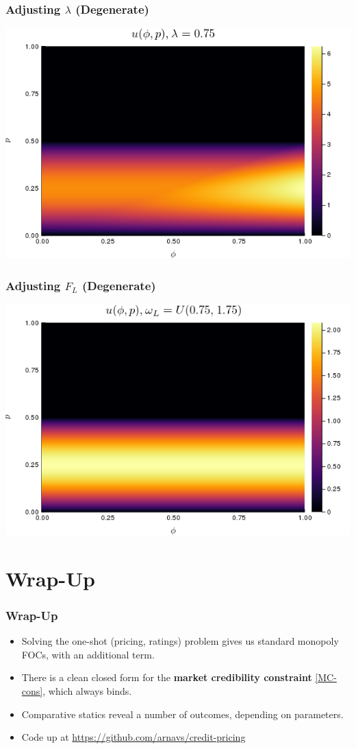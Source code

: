 \documentclass{beamer}
\begin{document}
\begin{frame}
    \frametitle{Adjusting $\lambda$ (Degenerate)}
    \includegraphics[scale=0.5]{high_lambda.png}
\end{frame}

\begin{frame}
    \frametitle{Adjusting $F_L$ (Degenerate)}
    \includegraphics[scale=0.5]{high_L.png}
\end{frame}


\section{Wrap-Up}

\begin{frame}
    \frametitle{Wrap-Up}
    \begin{itemize}
        \item Solving the one-shot (pricing, ratings) problem gives us standard monopoly FOCs, with an additional term.
        \item There is a clean closed form for the \textbf{market credibility constraint} \eqref{MC-cons}, which always binds.
        \item Comparative statics reveal a number of outcomes, depending on parameters.
        \item Code up at  \url{https://github.com/arnavs/credit-pricing}
    \end{itemize}
\end{frame}
\end{document}
